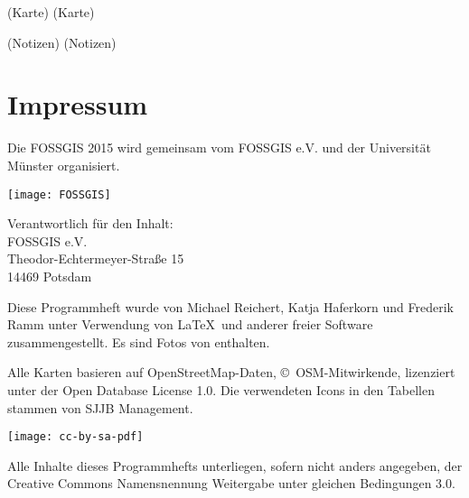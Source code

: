 \newpage
(Karte)
\newpage
(Karte)
\newpage


\newpage
(Notizen)
\newpage
(Notizen)
\newpage


\newpage
\section*{Impressum}
\label{impressum}
\vspace{-0.5em}


\begin{raggedright}
Die FOSSGIS 2015 wird gemeinsam vom FOSSGIS e.V. und der Universität Münster 
organisiert.

\vspace{0.5em}
	\texttt{[image: FOSSGIS]}

\vspace{0.5em}
\noindent Verantwortlich für den Inhalt:\\
FOSSGIS e.V.\\
Theodor-Echtermeyer-Straße 15\\
14469 Potsdam

\vspace{1em}
\noindent Diese Programmheft wurde von Michael Reichert, Katja Haferkorn und 
Frederik Ramm unter Verwendung von \LaTeX\ und anderer freier Software zusammengestellt. Es sind Fotos von %
enthalten.

\vspace{0.5em}

\noindent Alle Karten basieren auf Open\-Street\-Map-Daten, 
\mbox{\copyright\ OSM}-Mitwirkende, lizenziert unter der Open Database License 1.0.
Die verwendeten Icons in den Tabellen stammen von SJJB Management.


\vspace{1em}
\noindent \begin{minipage}[htbp]{0.2\textwidth}
\noindent\texttt{[image: cc-by-sa-pdf]}
\end{minipage}
\hfill
\begin{minipage}[hbtp]{0.74\textwidth}
Alle Inhalte dieses Programmhefts unterliegen, sofern nicht anders angegeben, 
der Creative Commons Namensnennung Weitergabe unter gleichen Bedingungen 3.0.
\end{minipage}
\end{raggedright}

